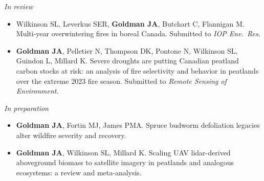 \documentclass[11pt]{article}
\newcommand{\me}[1]{\textbf{#1}}                         %
\newcommand{\sub}[1]{\par\vspace{4pt}\textit{#1}\par\nopagebreak\vspace{1pt}\nopagebreak}
\begin{document}
\sub{In review}
\begin{itemize}
  \item Wilkinson SL, Leverkus SER, \me{Goldman JA}, Butchart C, Flannigan M. Multi-year overwintering fires in boreal Canada. Submitted to \textit{IOP Env.\ Res.}
  \item \me{Goldman JA}, Pelletier N, Thompson DK, Pontone N, Wilkinson SL, Guindon L, Millard K. Severe droughts are putting Canadian peatland carbon stocks at risk: an analysis of fire selectivity and behavior in peatlands over the extreme 2023 fire season. Submitted to \textit{Remote Sensing of Environment}.
\end{itemize}

\sub{In preparation}
\begin{itemize}
  \item \me{Goldman JA}, Fortin MJ, James PMA. Spruce budworm defoliation legacies alter wildfire severity and recovery.
  \item \me{Goldman JA}, Wilkinson SL, Millard K. Scaling UAV lidar-derived aboveground biomass to satellite imagery in peatlands and analogous ecosystems: a review and meta-analysis.
\end{itemize}

\end{document}
